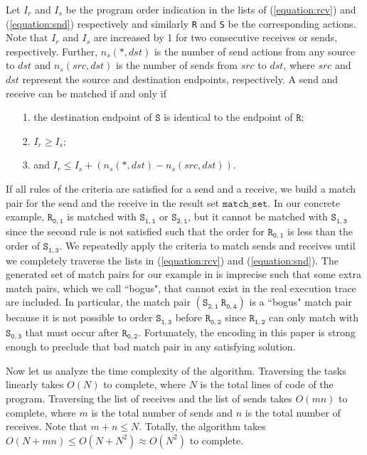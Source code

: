 Let $I_r$ and $I_s$ be the program order indication in the lists of (\ref{equation:rcv}) and (\ref{equation:snd}) respectively and similarly \texttt{R} and \texttt{S} be the corresponding actions. Note that $I_r$ and $I_s$ are increased by 1 for two consecutive receives or sends, respectively. Further, $n_s(*,\mathit{dst})$ is the number of send actions from any source to $\mathit{dst}$ and $n_s(\mathit{src},\mathit{dst})$ is the number of sends from $\mathit{src}$ to $\mathit{dst}$, where $\mathit{src}$ and $\mathit{dst}$ represent the source and destination endpoints, respectively. A send and receive can be matched if and only if
\begin{itemize}
\item[1.] the destination endpoint of $\mathtt{S}$ is identical to the endpoint of $\mathtt{R}$;
\item[2.] $I_r \geq I_s$;
\item[3.] and $I_r \leq I_s + (n_s(*,\mathit{dst}) - n_s(\mathit{src},\mathit{dst}))$.
\end{itemize}
If all rules of the criteria are satisfied for a send and a receive, we build a match pair for the send and the receive in the result set $\mathtt{match\_set}$. In our concrete example, $\mathtt{R_{0,1}}$ is matched with $\mathtt{S_{1,1}}$ or $\mathtt{S_{2,1}}$, but it cannot be matched with $\mathtt{S_{1,3}}$ since the second rule is not satisfied such that the order for $\mathtt{R_{0,1}}$ is less than the order of $\mathtt{S_{1,3}}$. We repeatedly apply the criteria to match sends and receives until we completely traverse the lists in (\ref{equation:rcv}) and (\ref{equation:snd}). The generated set of match pairs for our example in  is imprecise such that some extra match pairs, which we call ``bogus", that cannot exist in the real execution trace are included. In particular, the match pair $(\mathtt{S_{2,1}}\ \mathtt{R_{0,4}})$ is a ``bogus" match pair because it is not possible to order $\mathtt{S_{1,3}}$ before $\mathtt{R_{0,2}}$ since $\mathtt{R_{1,2}}$ can only match with $\mathtt{S_{0,3}}$ that must occur after $\mathtt{R_{0,2}}$. Fortunately, the encoding in this paper is strong enough to preclude that bad match pair in any satisfying solution.


Now let us analyze the time complexity of the algorithm. Traversing the tasks linearly takes $O(N)$ to complete, where $N$ is the total lines of code of the program. Traversing the list of receives and the list of sends takes $O(mn)$ to complete, where $m$ is the total number of sends and $n$ is the total number of receives. Note that $m + n \le N$. Totally, the algorithm takes $O(N + mn) \leq O(N + N^2) \approx O(N^2)$ to complete.

